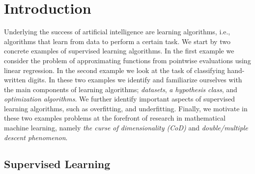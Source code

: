\chapter{Introduction} %

\label{Chapter1} %
\setcounter{chapter}{1}

\newcommand{\keyword}[1]{\textbf{#1}}
\newcommand{\tabhead}[1]{\textbf{#1}}
\newcommand{\code}[1]{\texttt{#1}}
\newcommand{\file}[1]{\texttt{\bfseries#1}}
\newcommand{\option}[1]{\texttt{\itshape#1}}
Underlying the success of artificial intelligence are learning algorithms, i.e.,
algorithms that learn from data to perform a certain task. We start by
two concrete examples of supervised learning algorithms. In the first example we
consider the problem of approximating functions from pointwise evaluations using linear regression. In the second example we look at the task of
classifying hand-written digits. In these two examples we identify and
familiarize ourselves with the main components of learning algorithms;
\emph{datasets}, \emph{a hypothesis class}, and \emph{optimization algorithms}.
We further identify important aspects of supervised learning algorithms, such as
overfitting, and underfitting. Finally, we motivate in these two examples
problems at the forefront of research in mathematical machine learning, namely
\emph{the curse of dimensionality (CoD)} and \emph{double/multiple descent phenomenon}. 
 
\section{Supervised Learning}
